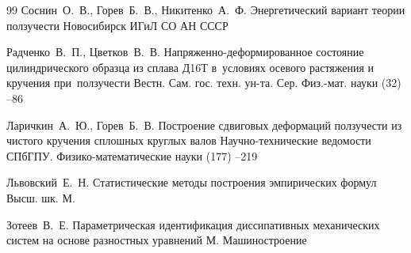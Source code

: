 \begin{thebibliography}{99}
\by Соснин~О.~В., Горев~Б.~В., Никитенко~А.~Ф.
\book Энергетический вариант теории ползучести
\publaddr Новосибирск
\publ ИГиЛ СО АН СССР

\by Радченко~В.~П., Цветков~В.~В.
\paper Напряженно-деформированное состояние цилиндрического образца из сплава Д16Т в~условиях осевого растяжения и кручения при~ползучести
\jour Вестн. Сам. гос. техн. ун-та. Сер. Физ.-мат. науки
(32)
--86

\by Ларичкин~А.~Ю., Горев~Б.~В.
\paper Построение сдвиговых деформаций ползучести из чистого кручения сплошных круглых валов
\jour Научно-технические ведомости СПбГПУ. Физико-математические науки
 (177)
--219

\by Львовский~Е.~Н.
\book Статистические методы построения эмпирических формул
\publ Высш. шк.
\publaddr М.

\by Зотеев~В.~Е.
\book Параметрическая идентификация диссипативных механических систем на основе разностных уравнений
\publaddr М.
\publ Машиностроение


\end{thebibliography}
